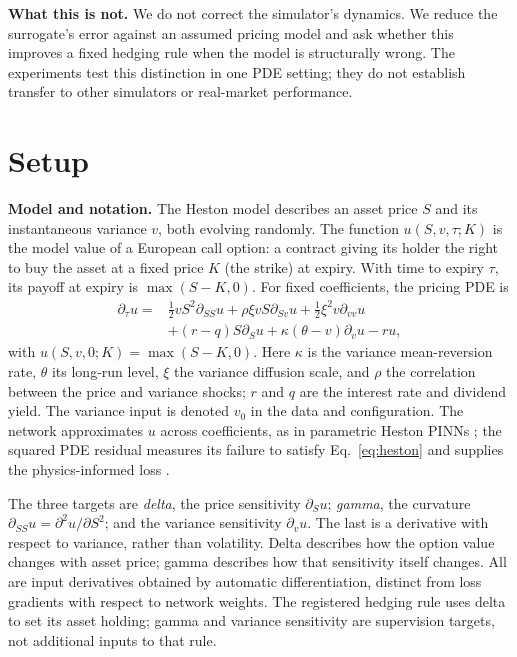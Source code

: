 \documentclass{article}
\begin{document}
\textbf{What this is not.} We do not correct the simulator's dynamics. We
reduce the surrogate's error against an assumed pricing model and ask whether this
improves a fixed hedging rule when the model is structurally wrong. The experiments
test this distinction in one PDE setting; they do not establish transfer to other
simulators or real-market performance.

\section{Setup}
\label{sec:setup}

\textbf{Model and notation.} The Heston model \citep{heston1993closed} describes an
asset price $S$ and its instantaneous variance $v$, both evolving randomly. The
function $u(S,v,\tau;K)$ is the model value of a European call option: a contract
giving its holder the right to buy the asset at a fixed price $K$ (the strike)
at expiry. With time to expiry $\tau$, its payoff at expiry is $\max(S-K,0)$. For fixed
coefficients, the pricing PDE is
\begin{equation}
\label{eq:heston}
\begin{aligned}
\partial_\tau u ={}& \tfrac12 vS^2\partial_{SS}u
  + \rho\xi vS\partial_{Sv}u + \tfrac12\xi^2v\partial_{vv}u \\
  &+ (r-q)S\partial_Su + \kappa(\theta-v)\partial_vu - ru,
\end{aligned}
\end{equation}
with $u(S,v,0;K)=\max(S-K,0)$. Here $\kappa$ is the variance mean-reversion
rate, $\theta$ its long-run level, $\xi$ the variance diffusion scale, and $\rho$ the
correlation between the price and variance shocks; $r$ and $q$ are the interest rate
and dividend yield. The variance input is denoted $v_0$ in the data and configuration.
The network approximates $u$ across coefficients, as in parametric Heston PINNs
\citep{hainaut2024option}; the squared PDE residual measures its failure to satisfy
Eq.~\eqref{eq:heston} and supplies the physics-informed loss \citep{raissi2019physics}.

The three targets are \emph{delta}, the price sensitivity $\partial_Su$;
\emph{gamma}, the curvature $\partial_{SS}u=\partial^2u/\partial S^2$; and the
variance sensitivity $\partial_vu$. The last is a derivative with respect to
variance, rather than volatility. Delta describes how the option value changes
with asset price; gamma describes how that sensitivity itself changes. All are input derivatives obtained by automatic
differentiation, distinct from loss gradients with respect to network weights.
The registered hedging rule uses delta to set its asset holding; gamma and variance
sensitivity are supervision targets, not additional inputs to that rule.
\end{document}
